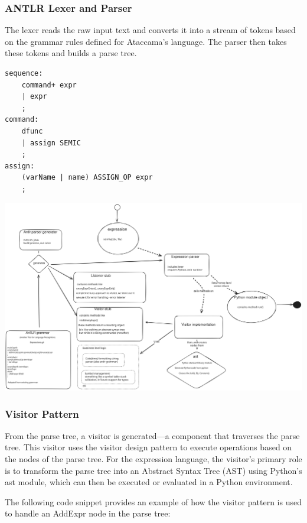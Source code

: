 \subsubsection{ANTLR Lexer and Parser}

The lexer reads the raw input text and converts it into a stream of tokens based on the grammar rules defined for Ataccama’s language. The parser then takes these tokens and builds a parse tree.


\begin{verbatim}
sequence:
    command+ expr
    | expr
    ;
command:
    dfunc
    | assign SEMIC
    ;
assign:
    (varName | name) ASSIGN_OP expr
    ;
\end{verbatim}

\includegraphics{img/expressions.svg}

\subsubsection{Visitor Pattern}
 From the parse tree, a visitor is generated—a component that traverses the parse tree. This visitor uses the visitor design pattern to execute operations based on the nodes of the parse tree. For the expression language, the visitor's primary role is to transform the parse tree into an Abstract Syntax Tree (AST) using Python’s ast module, which can then be executed or evaluated in a Python environment.

The following code snippet provides an example of how the visitor pattern is used to handle an AddExpr node in the parse tree:

